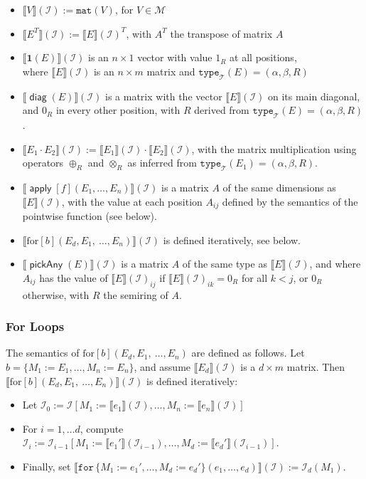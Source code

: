 \documentclass{article}
\DeclareMathOperator{\pickAny}{\mathsf{pickAny}}
\newcommand{\tenv}{\mathcal{T}}
\newcommand{\ttypet}{\texttt{type}_{\tenv}}
\newcommand{\rowdom}{\mathbf{1}}
\DeclareMathOperator{\diag}{\mathsf{diag}}
\DeclareMathOperator{\Apply}{\mathsf{apply}}
\newcommand{\I}{\mathcal{I}}
\newcommand{\sem}[2]{\llbracket #1 \rrbracket(#2)}
\newcommand{\Mnam}{\mathcal{M}}
\newcommand{\conc}{\texttt{mat}}
\begin{document}
\begin{itemize}
    \item $\sem{V}{\I} := \conc(V)$, for $V\in \Mnam$
    \item $\sem{E^T}{\I} := \sem{E}{\I}^T$, with $A^T$ the transpose of matrix $A$
    \item $\sem{\rowdom(E)}{\I}$ is an $n\times 1$ vector with value $1_R$ at all positions,\\
          where $\sem{E}{\I}$ is an $n \times m$ matrix and $\ttypet(E) = (\alpha, \beta, R)$
    \item $\sem{\diag(E)}{\I}$ is a matrix with the vector $\sem{E}{\I}$ on its main diagonal, and $0_R$ in every other position, with $R$ derived from $\ttypet(E) = (\alpha, \beta, R)$.
    \item $\sem{E_1\cdot E_2}{\I} := \sem{E_1}{\I} \cdot \sem{E_2}{\I}$, with the matrix multiplication using operators $\oplus_R$ and $\otimes_R$ as inferred from $\ttypet(E_1) = (\alpha,\beta,R)$.
    \item $\sem{\Apply[f](E_1,\ldots ,E_n)}{\I}$ is a matrix $A$ of the same dimensions as $\sem{E}{\I}$, with the value at each position $A_{ij}$ defined by the semantics of the pointwise function (see below).
    \item $\sem{\text{for}[b](E_d, E_1,\ \ldots,E_n)}{\I}$ is defined iteratively, see below.
    \item $\sem{\pickAny(E)}{\I}$ is a matrix $A$ of the same type as $\sem{E}{\I}$, and where $A_{ij}$ has the value of $\sem{E}{\I}_{ij}$ if $\sem{E}{\I}_{ik} = 0_R$ for all $k < j$, or $0_R$ otherwise, with $R$ the semiring of $A$.
\end{itemize}

\subsubsection*{For Loops}
The semantics of $\text{for}[b](E_d, E_1,\ \ldots,E_n)$ are defined as follows.
Let $b = \{ M_1 := E_1, \ldots, M_n := E_n \}$, and assume $\sem{E_d}{\I}$ is a $d \times m$ matrix.
Then $\sem{\text{for}[b](E_d, E_1,\ \ldots,E_n)}{\I}$ is defined iteratively:

\begin{itemize}
    \item Let $\I_0 := \I[M_1 := \sem{e_1}{\I}, \ldots, M_n := \sem{e_n}{\I}]$
    \item For $i = 1,\ldots d$, compute $\I_i := \I_{i-1}[M_1 := \sem{e_1'}{\I_{i-1}}, \ldots, M_d := \sem{e_d'}{\I_{i-1}}]$.
    \item Finally, set $\sem{\texttt{for}\, \{ M_1 := e_1', \ldots, M_d := e_d' \}(e_1, \ldots, e_d)}{\I}:= \I_d(M_1)$.
\end{itemize}
\end{document}
